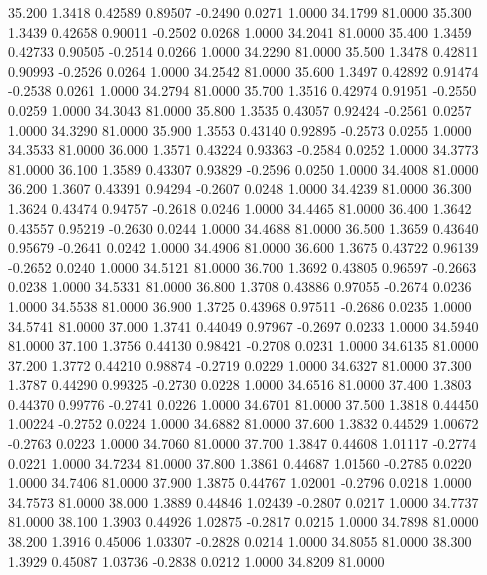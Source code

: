   35.200   1.3418   0.42589   0.89507  -0.2490   0.0271   1.0000  34.1799  81.0000
  35.300   1.3439   0.42658   0.90011  -0.2502   0.0268   1.0000  34.2041  81.0000
  35.400   1.3459   0.42733   0.90505  -0.2514   0.0266   1.0000  34.2290  81.0000
  35.500   1.3478   0.42811   0.90993  -0.2526   0.0264   1.0000  34.2542  81.0000
  35.600   1.3497   0.42892   0.91474  -0.2538   0.0261   1.0000  34.2794  81.0000
  35.700   1.3516   0.42974   0.91951  -0.2550   0.0259   1.0000  34.3043  81.0000
  35.800   1.3535   0.43057   0.92424  -0.2561   0.0257   1.0000  34.3290  81.0000
  35.900   1.3553   0.43140   0.92895  -0.2573   0.0255   1.0000  34.3533  81.0000
  36.000   1.3571   0.43224   0.93363  -0.2584   0.0252   1.0000  34.3773  81.0000
  36.100   1.3589   0.43307   0.93829  -0.2596   0.0250   1.0000  34.4008  81.0000
  36.200   1.3607   0.43391   0.94294  -0.2607   0.0248   1.0000  34.4239  81.0000
  36.300   1.3624   0.43474   0.94757  -0.2618   0.0246   1.0000  34.4465  81.0000
  36.400   1.3642   0.43557   0.95219  -0.2630   0.0244   1.0000  34.4688  81.0000
  36.500   1.3659   0.43640   0.95679  -0.2641   0.0242   1.0000  34.4906  81.0000
  36.600   1.3675   0.43722   0.96139  -0.2652   0.0240   1.0000  34.5121  81.0000
  36.700   1.3692   0.43805   0.96597  -0.2663   0.0238   1.0000  34.5331  81.0000
  36.800   1.3708   0.43886   0.97055  -0.2674   0.0236   1.0000  34.5538  81.0000
  36.900   1.3725   0.43968   0.97511  -0.2686   0.0235   1.0000  34.5741  81.0000
  37.000   1.3741   0.44049   0.97967  -0.2697   0.0233   1.0000  34.5940  81.0000
  37.100   1.3756   0.44130   0.98421  -0.2708   0.0231   1.0000  34.6135  81.0000
  37.200   1.3772   0.44210   0.98874  -0.2719   0.0229   1.0000  34.6327  81.0000
  37.300   1.3787   0.44290   0.99325  -0.2730   0.0228   1.0000  34.6516  81.0000
  37.400   1.3803   0.44370   0.99776  -0.2741   0.0226   1.0000  34.6701  81.0000
  37.500   1.3818   0.44450   1.00224  -0.2752   0.0224   1.0000  34.6882  81.0000
  37.600   1.3832   0.44529   1.00672  -0.2763   0.0223   1.0000  34.7060  81.0000
  37.700   1.3847   0.44608   1.01117  -0.2774   0.0221   1.0000  34.7234  81.0000
  37.800   1.3861   0.44687   1.01560  -0.2785   0.0220   1.0000  34.7406  81.0000
  37.900   1.3875   0.44767   1.02001  -0.2796   0.0218   1.0000  34.7573  81.0000
  38.000   1.3889   0.44846   1.02439  -0.2807   0.0217   1.0000  34.7737  81.0000
  38.100   1.3903   0.44926   1.02875  -0.2817   0.0215   1.0000  34.7898  81.0000
  38.200   1.3916   0.45006   1.03307  -0.2828   0.0214   1.0000  34.8055  81.0000
  38.300   1.3929   0.45087   1.03736  -0.2838   0.0212   1.0000  34.8209  81.0000
